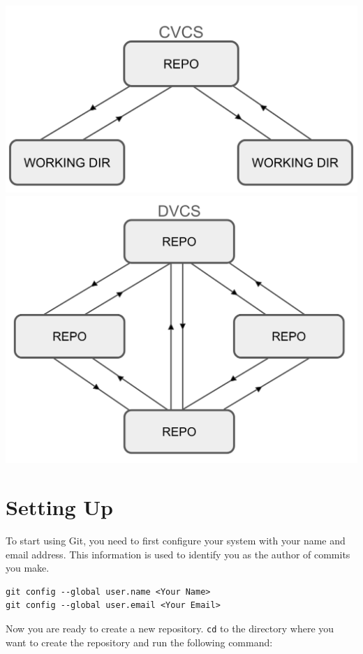 \documentclass[fleqn]{article}
\begin{document}
\begin{center}
    \includegraphics[scale=0.2]{cvcs.png}
    \includegraphics[scale=0.2]{dvcs.png}
\end{center}

\section*{Setting Up}

To start using Git, you need to first configure your system with your name and
email address. This information is used to identify you as the author of commits
you make.

\begin{lstlisting}
git config --global user.name <Your Name>
git config --global user.email <Your Email>
\end{lstlisting}

Now you are ready to create a new repository. \texttt{cd} to the directory where
you want to create the repository and run the following command:
\end{document}
